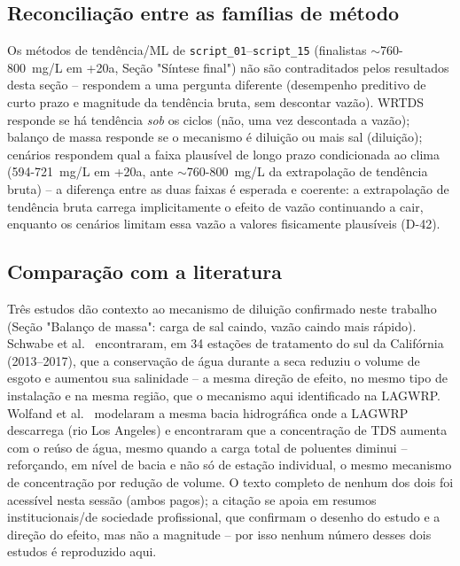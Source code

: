 \subsection{Reconciliação entre as famílias de método}

Os métodos de tendência/ML de \texttt{script\_01}--\texttt{script\_15} (finalistas $\sim$760-800~mg/L em +20a, Seção "Síntese final") não são contraditados pelos resultados desta seção -- respondem a uma pergunta diferente (desempenho preditivo de curto prazo e magnitude da tendência bruta, sem descontar vazão). WRTDS responde se há tendência \textit{sob} os ciclos (não, uma vez descontada a vazão); balanço de massa responde se o mecanismo é diluição ou mais sal (diluição); cenários respondem qual a faixa plausível de longo prazo condicionada ao clima (594-721~mg/L em +20a, ante $\sim$760-800~mg/L da extrapolação de tendência bruta) -- a diferença entre as duas faixas é esperada e coerente: a extrapolação de tendência bruta carrega implicitamente o efeito de vazão continuando a cair, enquanto os cenários limitam essa vazão a valores fisicamente plausíveis (D-42).

\subsection{Comparação com a literatura}

Três estudos dão contexto ao mecanismo de diluição confirmado neste trabalho (Seção "Balanço de massa": carga de sal caindo, vazão caindo mais rápido). Schwabe et al.\ \cite{schwabe2020unintended} encontraram, em 34 estações de tratamento do sul da Califórnia (2013--2017), que a conservação de água durante a seca reduziu o volume de esgoto e aumentou sua salinidade -- a mesma direção de efeito, no mesmo tipo de instalação e na mesma região, que o mecanismo aqui identificado na LAGWRP. Wolfand et al.\ \cite{wolfand2022dilution} modelaram a mesma bacia hidrográfica onde a LAGWRP descarrega (rio Los Angeles) e encontraram que a concentração de TDS aumenta com o reúso de água, mesmo quando a carga total de poluentes diminui -- reforçando, em nível de bacia e não só de estação individual, o mesmo mecanismo de concentração por redução de volume. O texto completo de nenhum dos dois foi acessível nesta sessão (ambos pagos); a citação se apoia em resumos institucionais/de sociedade profissional, que confirmam o desenho do estudo e a direção do efeito, mas não a magnitude -- por isso nenhum número desses dois estudos é reproduzido aqui.

